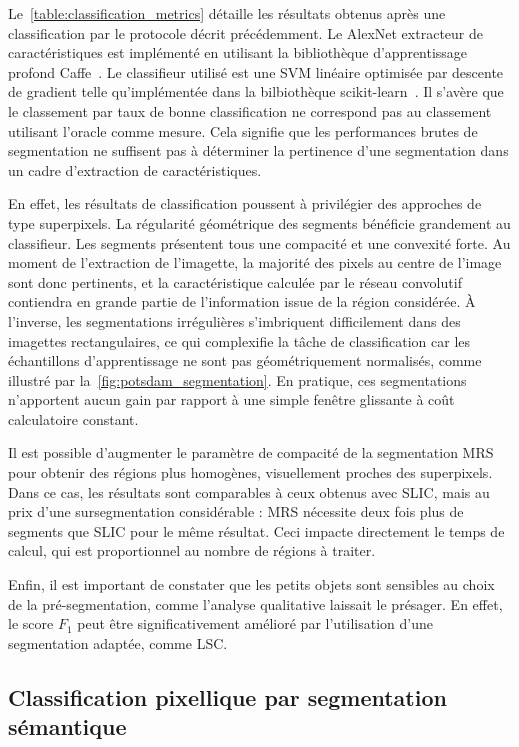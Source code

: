 Le~\cref{table:classification_metrics} détaille les résultats obtenus après une classification par le protocole décrit précédemment. Le AlexNet extracteur de caractéristiques est implémenté en utilisant la bibliothèque d'apprentissage profond Caffe~\cite{jia_caffe_2014}. Le classifieur utilisé est une \gls{SVM} linéaire optimisée par descente de gradient telle qu'implémentée dans la bilbiothèque scikit-learn~\cite{pedregosa_scikit-learn_2011}.
Il s'avère que le classement par taux de bonne classification ne correspond pas au classement utilisant l'oracle comme mesure. Cela signifie que les performances brutes de segmentation ne suffisent pas à déterminer la pertinence d'une segmentation dans un cadre d'extraction de caractéristiques.

En effet, les résultats de classification poussent à privilégier des approches de type superpixels. La régularité géométrique des segments bénéficie grandement au classifieur. Les segments présentent tous une compacité et une convexité forte. Au moment de l'extraction de l'imagette, la majorité des pixels au centre de l'image sont donc pertinents, et la caractéristique calculée par le réseau convolutif contiendra en grande partie de l'information issue de la région considérée. À l'inverse, les segmentations irrégulières s'imbriquent difficilement dans des imagettes rectangulaires, ce qui complexifie la tâche de classification car les échantillons d'apprentissage ne sont pas géométriquement normalisés, comme illustré par la~\cref{fig:potsdam_segmentation}. En pratique, ces segmentations n'apportent aucun gain par rapport à une simple fenêtre glissante à coût calculatoire constant.

Il est possible d'augmenter le paramètre de compacité de la segmentation \gls{MRS} pour obtenir des régions plus homogènes, visuellement proches des superpixels. Dans ce cas, les résultats sont comparables à ceux obtenus avec \gls{SLIC}, mais au prix d'une sursegmentation considérable : \gls{MRS} nécessite deux fois plus de segments que \gls{SLIC} pour le même résultat. Ceci impacte directement le temps de calcul, qui est proportionnel au nombre de régions à traiter.

Enfin, il est important de constater que les petits objets sont sensibles au choix de la pré-segmentation, comme l'analyse qualitative laissait le présager. En effet, le score $F_1$ peut être significativement amélioré par l'utilisation d'une segmentation adaptée, comme \gls{LSC}.

\subsection{Classification pixellique par segmentation sémantique}
\label{sec:results_pixel}

